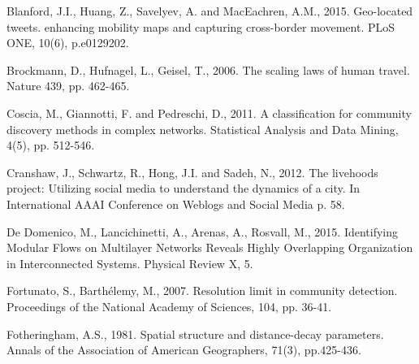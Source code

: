 \documentclass[]{tGIS2e}
\begin{document}


\begin{thebibliography}{9}
Blanford, J.I., Huang, Z., Savelyev, A. and MacEachren, A.M., 2015. Geo-located tweets. enhancing mobility maps and capturing cross-border movement. PLoS ONE, 10(6), p.e0129202.

Brockmann, D., Hufnagel, L., Geisel, T., 2006. The scaling laws of human travel. Nature 439, pp. 462-465.

Coscia, M., Giannotti, F. and Pedreschi, D., 2011. A classification for community discovery methods in complex networks. Statistical Analysis and Data Mining, 4(5), pp. 512-546.

Cranshaw, J., Schwartz, R., Hong, J.I. and Sadeh, N., 2012. The livehoods project: Utilizing social media to understand the dynamics of a city. In International AAAI Conference on Weblogs and Social Media p. 58.

De Domenico, M., Lancichinetti, A., Arenas, A., Rosvall, M., 2015. Identifying Modular Flows on Multilayer Networks Reveals Highly Overlapping Organization in Interconnected Systems. Physical Review X, 5.

Fortunato, S., Barthélemy, M., 2007. Resolution limit in community detection. Proceedings of the National Academy of Sciences, 104, pp. 36-41. 

Fotheringham, A.S., 1981. Spatial structure and distance-decay parameters. Annals of the Association of American Geographers, 71(3), pp.425-436.



\end{thebibliography}
\end{document}
